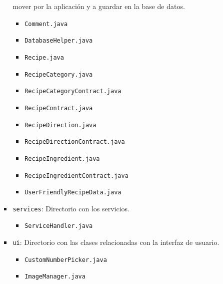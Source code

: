 \begin{itemize}
\begin{itemize}
\begin{itemize}
      mover por la aplicación y a guardar en la base de datos.
      \begin{itemize}
      \item \texttt{Comment.java}
      \item \texttt{DatabaseHelper.java}
      \item \texttt{Recipe.java}
      \item \texttt{RecipeCategory.java}
      \item \texttt{RecipeCategoryContract.java}
      \item \texttt{RecipeContract.java}
      \item \texttt{RecipeDirection.java}
      \item \texttt{RecipeDirectionContract.java}
      \item \texttt{RecipeIngredient.java}
      \item \texttt{RecipeIngredientContract.java}
      \item \texttt{UserFriendlyRecipeData.java}
      \end{itemize}
    \item \texttt{services}: Directorio con los servicios.
      \begin{itemize}
      \item \texttt{ServiceHandler.java}
      \end{itemize}
    \item \texttt{ui}: Directorio con las clases relacionadas con la interfaz
      de usuario.
      \begin{itemize}
      \item \texttt{CustomNumberPicker.java}
      \item \texttt{ImageManager.java}
      \end{itemize}
    \end{itemize}
    

\end{itemize}
\end{itemize}
